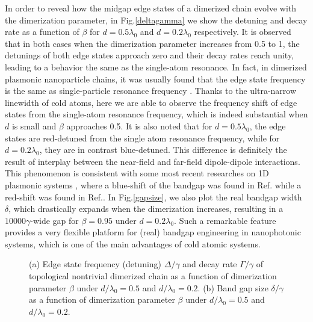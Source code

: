 \documentclass[aps,pra,reprint,groupedaddress,nofootinbib,longbibliography,showpacs]{revtex4-1}
\begin{document}
In order to reveal how the midgap edge states of a dimerized chain evolve with the dimerization parameter, in Fig.\ref{deltagamma} we show the detuning and decay rate as a function of $\beta$ for $d=0.5\lambda_0$ and $d=0.2\lambda_0$ respectively. It is observed that in both cases when the dimerization parameter increases from 0.5 to 1, the detunings of both edge states approach zero and their decay rates reach unity, leading to a behavior the same as the single-atom resonance. In fact, in dimerized plasmonic nanoparticle chains, it was usually found that the edge state frequency is the same as single-particle resonance frequency \cite{lingOE2015,downingPRB2017,pocockArxiv2017}. Thanks to the ultra-narrow linewidth of cold atoms, here we are able to observe the frequency shift of edge states from the single-atom resonance frequency, which is indeed substantial when $d$ is small and $\beta$ approaches 0.5. It is also noted that for $d=0.5\lambda_0$, the edge states are red-detuned from the single atom resonance frequency, while for $d=0.2\lambda_0$, they are in contrast blue-detuned.  This difference is definitely the result of interplay between the near-field and far-field dipole-dipole interactions. This phenomenon is consistent with some most recent researches on 1D plasmonic systems \cite{zhangPRB2018,downing2018topological}, where a blue-shift of the bandgap was found in Ref.\cite{zhangPRB2018} while a red-shift was found in Ref.\cite{downing2018topological}.  In Fig.\ref{gapsize}, we also plot the real bandgap width $\delta$, which drastically expands when the dimerization increases, resulting in a $10000\gamma$-wide gap for $\beta=0.95$ under $d=0.2\lambda_0$. Such a remarkable feature provides a very flexible platform for (real) bandgap engineering in nanophotonic systems, which is one of the main advantages of cold atomic systems.

\begin{figure}[htbp]
	\centering
	\flushleft
	\hspace{0.01in}
	\caption{(a) Edge state frequency (detuning) $\Delta/\gamma$ and decay rate $\Gamma/\gamma$ of topological nontrivial dimerized chain as a function of dimerization parameter $\beta$ under $d/\lambda_0=0.5$ and $d/\lambda_0=0.2$. (b) Band gap size $\delta/\gamma$ as a function of dimerization parameter $\beta$ under $d/\lambda_0=0.5$ and $d/\lambda_0=0.2$. }
	
	\label{figparameter}
\end{figure}
\end{document}
